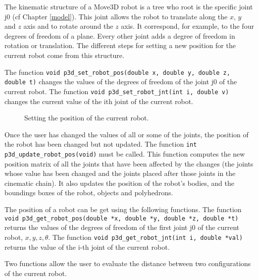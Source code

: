 The kinematic structure of a Move3D robot is a tree who root is the
specific joint j0 (cf Chapter \ref{model}). This joint allows the
robot to translate along the $x$, $y$ and $z$ axis and to rotate
around the $z$ axis. It correspond, for example, to the four degrees
of freedom of a plane. Every other joint adds a degree of freedom in
rotation or translation. The different steps for setting a new
position for the current robot come from this structure.


The function {\tt void p3d\_set\_robot\_pos(double x, double y, double
z, double t)}  changes the values of the
degrees of freedom of the joint j0 of the current robot. The function
{\tt void p3d\_set\_robot\_jnt(int i, double v)}
 changes the current value of the ith
joint of the current robot.

\begin{figure}[hbt]
\centerline{
}
\caption{\small 
Setting the position of the current robot.
}
\label{FIG_SETPOS1}
\end{figure}

Once the user has changed the values of all or some of the joints, the
position of the robot has been changed but not updated. The function
{\tt int p3d\_update\_robot\_pos(void)}
 must be called. This function
computes the new position matrix of all the joints that have been
affected by the changes (the joints whose value has been changed and
the joints placed after those joints in the cinematic chain). It also
updates the position of the robot's bodies, and the boundings boxes of
the robot, objects and polyhedrons.

The position of a robot can be get using the following functions. The
function {\tt void p3d\_get\_robot\_pos(double *x, double *y, double
*z, double *t)}  returns the values of the
degrees of freedom of the first joint j0 of the current robot,
$x,y,z,\theta$. The function {\tt void p3d\_get\_robot\_jnt(int i,
double *val)}  returns the value of
the i-th joint of the current robot.

Two functions allow the user to evaluate the distance between two
configurations of the current robot.

